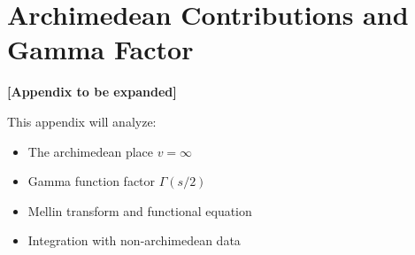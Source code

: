 \section{Archimedean Contributions and Gamma Factor}
\label{app:archimedean}

\textbf{[Appendix to be expanded]}

This appendix will analyze:
\begin{itemize}
\item The archimedean place $v = \infty$
\item Gamma function factor $\Gamma(s/2)$
\item Mellin transform and functional equation
\item Integration with non-archimedean data
\end{itemize}
